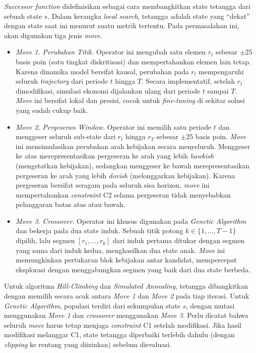 \textit{Successor function} didefinisikan sebagai cara membangkitkan state tetangga dari sebuah state $s$. Dalam kerangka \textit{local search}, tetangga adalah state yang ``dekat'' dengan state saat ini menurut suatu metrik tertentu. Pada permasalahan ini, akan digunakan tiga jenis \textit{move}.
\begin{itemize}
    \item \textit{Move 1. Perubahan Titik.} Operator ini mengubah satu elemen $r_t$ sebesar $\pm 25$ basis poin (satu tingkat diskritisasi) dan mempertahankan elemen lain tetap. Karena dinamika model bersifat kausal, perubahan pada $r_t$ mempengaruhi seluruh \textit{trajectory} dari periode $t$ hingga $T$. Secara implementatif, setelah $r_t$ dimodifikasi, simulasi ekonomi dijalankan ulang dari periode $t$ sampai $T$. \textit{Move} ini bersifat lokal dan presisi, cocok untuk \textit{fine-tuning} di sekitar solusi yang sudah cukup baik.
    \item \textit{Move 2. Pergeseran \textit{Window}.} Operator ini memilih satu periode $t$ dan menggeser seluruh sub-state dari $r_t$ hingga $r_T$ sebesar $\pm 25$ basis poin. \textit{Move} ini mensimulasikan perubahan arah kebijakan secara menyeluruh. Menggeser ke atas merepresentasikan pergeseran ke arah yang lebih \textit{hawkish} (mengetatkan kebijakan), sedangkan menggeser ke bawah merepresentasikan pergeseran ke arah yang lebih \textit{dovish} (melonggarkan kebijakan). Karena pergeseran bersifat seragam pada seluruh sisa horizon, \textit{move} ini mempertahankan \textit{constraint} C2 selama pergeseran tidak menyebabkan pelanggaran batas atas atau bawah.
    \item \textit{Move 3. Crossover.} Operator ini khusus digunakan pada \textit{Genetic Algorithm} dan bekerja pada dua state induk. Sebuah titik potong $k \in \{1, \dots, T-1\}$ dipilih, lalu segmen $[r_1, \dots, r_k]$ dari induk pertama ditukar dengan segmen yang sama dari induk kedua, menghasilkan dua state anak. \textit{Move} ini memungkinkan pertukaran blok kebijakan antar kandidat, mempercepat eksplorasi dengan menggabungkan segmen yang baik dari dua state berbeda.
\end{itemize}



Untuk algoritma \textit{Hill-Climbing} dan \textit{Simulated Annealing}, tetangga dibangkitkan dengan memilih secara acak antara \textit{Move 1} dan \textit{Move 2} pada tiap iterasi. Untuk \textit{Genetic Algorithm}, populasi terdiri dari sekumpulan state $s$, dengan mutasi menggunakan \textit{Move 1} dan \textit{crossover} menggunakan \textit{Move 3}. Perlu dicatat bahwa seluruh \textit{move} harus tetap menjaga \textit{constraint} C1 setelah modifikasi. Jika hasil modifikasi melanggar C1, state tetangga diperbaiki terlebih dahulu (dengan \textit{clipping} ke rentang yang diizinkan) sebelum dievaluasi.

